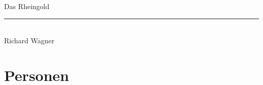 \documentclass[10.5pt,openany]{book}
\begin{document}
\frontmatter

\begin{titlepage}
\thispagestyle{empty}
\vspace*{3.2cm}
\begin{center}
{\Huge Das Rheingold}\\[3.4ex]
{\color{rule}\rule{0.4\textwidth}{0.4pt}}\\[3.2ex]
{\large Richard Wagner}
\end{center}
\vfill
\end{titlepage}

\tableofcontents
{}

\mainmatter

\chapter*{Personen}
\end{document}
